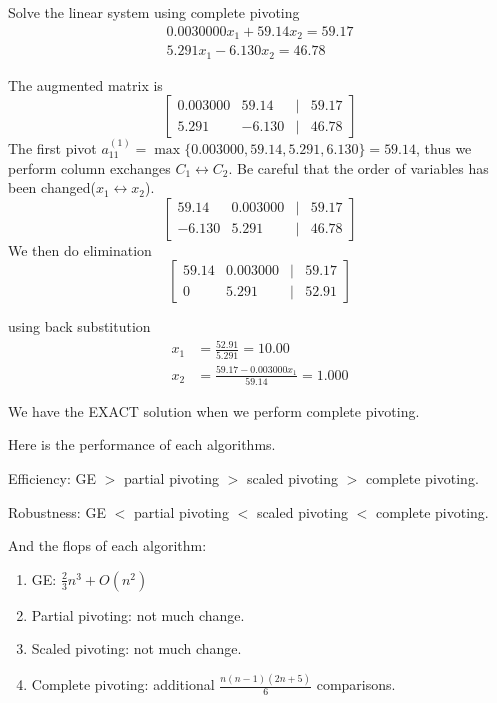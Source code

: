	\begin{ex}
		Solve the linear system using complete pivoting
		\begin{align*}
		0.0030000x_1 + 59.14x_2 = 59.17\\
		5.291x_1 - 6.130x_2 = 46.78
		\end{align*}
	\end{ex}
	\begin{solution}
		The augmented matrix is
		\[
		\begin{bmatrix}
		0.003000 & 59.14 &| &59.17\\
		5.291    & -6.130 &| &46.78
		\end{bmatrix}  
		\]
		The first pivot $a_{11}^{(1)} = \max\{0.003000, 59.14, 5.291, 6.130\} = 59.14$, thus we perform column exchanges $C_1\leftrightarrow C_2$. Be careful that the order of variables has been changed($x_1\leftrightarrow x_2$).
		\[ \begin{bmatrix}
		59.14 & 0.003000 &| &59.17\\
		-6.130 & 5.291 &| &46.78
		\end{bmatrix} \]
		We then do elimination
		\[ \begin{bmatrix}
		59.14 & 0.003000 &| &59.17\\
		0 & 5.291 &| &52.91
		\end{bmatrix} \]
		
		using back substitution
		\begin{align*}
		x_1 &= \frac{52.91}{5.291} = 10.00\\
		x_2 &= \frac{59.17 - 0.003000x_1}{59.14} = 1.000
		\end{align*}
		
		We have the EXACT solution when we perform complete pivoting.
	\end{solution}
	\begin{summary}
		Here is the performance of each algorithms.
		\item Efficiency: GE $>$ partial pivoting $>$ scaled pivoting $>$ complete pivoting.
		\item Robustness: GE $<$ partial pivoting $<$ scaled pivoting $<$ complete pivoting.
		
		And the flops of each algorithm:
		\begin{enumerate}
			\item 
			GE: $\frac{2}{3}n^3 + O(n^2)$
			\item 
			Partial pivoting: not much change.
			\item 
			Scaled pivoting: not much change.
			\item 
			Complete pivoting: additional $\frac{n(n-1)(2n+5)}{6}$ comparisons.
		\end{enumerate}
	\end{summary}
	
